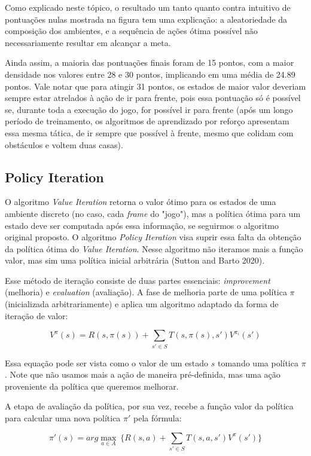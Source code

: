 \documentclass[letterpaper]{article} %
\begin{document}
Como explicado neste tópico, o resultado um tanto quanto contra intuitivo de pontuações nulas mostrada na figura tem uma explicação: a aleatoriedade da composição dos ambientes, e a sequência de ações ótima possível não necessariamente resultar em alcançar a meta.

Ainda assim, a maioria das pontuações finais foram de 15 pontos, com a maior densidade nos valores entre 28 e 30 pontos, implicando em uma média de 24.89 pontos. Vale notar que para atingir 31 pontos, os estados de maior valor deveriam sempre estar atrelados à ação de ir para frente, pois essa pontuação só é possível se, durante toda a execução do jogo, for possível ir para frente (após um longo período de treinamento, os algoritmos de aprendizado por reforço apresentam essa mesma tática, de ir sempre que possível à frente, mesmo que colidam com obstáculos e voltem duas casas).

\subsection{Policy Iteration}
O algoritmo \textit{Value Iteration} retorna o valor ótimo para os estados de uma ambiente discreto (no caso, cada \textit{frame} do "jogo"), mas a política ótima para um estado deve ser computada após essa informação, se seguirmos o algoritmo original proposto. O algoritmo \textit{Policy Iteration} visa suprir essa falta da obtenção da política ótima do \textit{Value Iteration}. Nesse algoritmo não iteramos mais a função valor, mas sim uma política inicial arbitrária (Sutton and Barto 2020).

Esse método de iteração consiste de duas partes essenciais: \textit{improvement} (melhoria) e \textit{evaluation} (avaliação). A fase de melhoria parte de uma política $\pi$ (inicializada arbitrariamente) e aplica um algoritmo adaptado da forma de iteração de valor:

$$
V^{\pi}(s) = R(s,\pi(s)) + \sum_{s' \in S} T(s,\pi(s),s')  V^{\pi_i}(s')
$$

Essa equação pode ser vista como o valor de um estado $s$ tomando uma política $\pi$. Note que não usamos mais a ação de maneira pré-definida, mas uma ação proveniente da política que queremos melhorar.

A etapa de avaliação da política, por sua vez, recebe a função valor da política para calcular uma nova política $\pi'$ pela fórmula:

$$
\pi'(s) = arg \max_{a \in A} \ \{ R(s,a) + \sum_{s' \in S} T(s,a,s')  V^{\pi}(s')\}
$$
\end{document}
